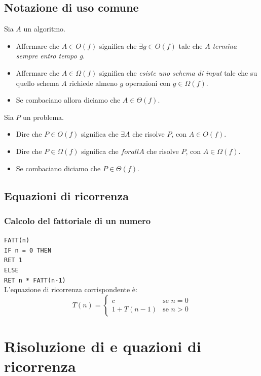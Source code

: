 \documentclass[a4paper,12pt,twoside]{report}
\newcommand\pseudo[1]{\setlength\parindent{0pt}\texttt{#1}\setlength\parindent{24pt} \\}
\begin{document}
\subsection{Notazione di uso comune}
Sia $A$ un algoritmo. 
\begin{itemize}
\item Affermare che $A \in O(f)$ significa che $\exists g \in O(f)$ tale che $A$ \emph{termina sempre entro tempo g}.
\item Affermare che $A \in \Omega(f)$ significa che \emph{esiste uno schema di input} tale che su quello schema $A$ richiede almeno $g$ operazioni con $g \in \Omega(f)$.
\item Se combaciano allora diciamo che $A \in \Theta(f)$.
\end{itemize}
Sia $P$ un problema.
\begin{itemize}
\item Dire che $P \in O(f)$ significa che $\exists A$ che risolve $P$, con $A \in O(f)$.
\item Dire che $P \in \Omega(f)$ significa che $forall A$ che risolve $P$, con $A \in \Omega (f)$.
\item Se combaciano diciamo che $P \in \Theta (f)$.
\end{itemize}

\subsection {Equazioni di ricorrenza}
\subsubsection{Calcolo del fattoriale di un numero}
\pseudo{FATT(n)}
\indent \texttt{IF n = 0 THEN \\
\indent\indent RET 1 \\
\indent ELSE \\
\indent\indent RET n * FATT(n-1) \\
}
L'equazione di ricorrenza corrispondente \`{e}:
\begin{equation}
T(n) = 
\begin{cases}
c & \text{se $n = 0$}\\ 
1 + T(n-1) & \text{se $n > 0$}
\end{cases}
\end{equation}

\section{Risoluzione di e quazioni di ricorrenza}
\end{document}

